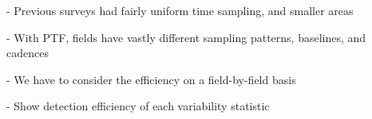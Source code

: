 \documentclass[12pt,preprint]{aastex}
\begin{document}
- Previous surveys had fairly uniform time sampling, and smaller areas

- With PTF, fields have vastly different sampling patterns, baselines, and cadences

- We have to consider the efficiency on a field-by-field basis

- Show detection efficiency of each variability statistic





\end{document}
